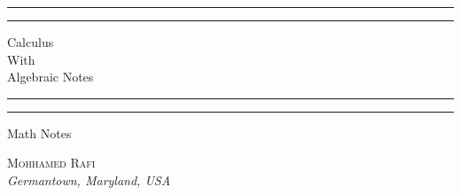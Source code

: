 \begin{titlepage} 
  \centering 
	\scshape 
	\vspace*{\baselineskip} 
	
	\rule{\textwidth}{1.6pt}\vspace*{-\baselineskip}\vspace*{2pt} 
	\rule{\textwidth}{0.4pt}
	
	\vspace{0.75\baselineskip} 
	
	{\LARGE Calculus \\ With \\ Algebraic Notes \\} 
	\vspace{0.75\baselineskip} 
	
	\rule{\textwidth}{0.4pt}\vspace*{-\baselineskip}\vspace{3.2pt} 
	\rule{\textwidth}{1.6pt} 
	\vspace{2\baselineskip} 
	
	Math Notes 
	
	\vspace*{3\baselineskip} 
  
  \vfill
  {\scshape\Large Mohhamed Rafi \\}
  \textit{Germantown, Maryland, USA} 
	\vspace{0.5\baselineskip}
	
\end{titlepage}
